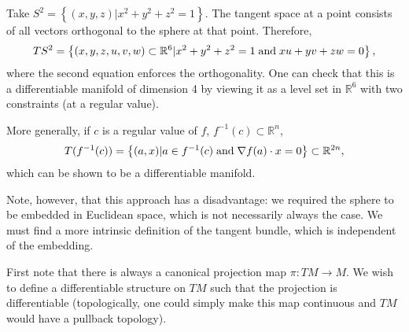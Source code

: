 \documentclass{../mathnotes}
\begin{document}
\begin{exmp}
    Take $S^2=\left\{ (x,y,z) | x^2+y^2+z^2=1 \right\}$. The tangent space at a point consists of all vectors orthogonal to the sphere at that point.
    Therefore,
    \begin{align*}
        TS^2=\left\{ (x,y,z,u,v,w)\subset \mathbb{R}^6|x^2+y^2+z^2=1 \;\textnormal{and}\; xu+yv+zw=0 \right\},
    \end{align*}
    where the second equation enforces the orthogonality. One can check that this is a differentiable manifold of dimension 4 by viewing it as a level set in
    $\mathbb{R}^6$ with two constraints (at a regular value).

    More generally, if $c$ is a regular value of $f$, $f^{-1}(c)\subset\mathbb{R}^n$,
    \begin{align*}
        T(f^{-1}(c))=\left\{ (a,x)|a\in f^{-1}(c) \;\textnormal{and}\; \nabla f(a)\cdot x=0 \right\}\subset \mathbb{R}^{2n},
    \end{align*}
    which can be shown to be a differentiable manifold.
\end{exmp}

Note, however, that this approach has a disadvantage: we required the sphere to be embedded in Euclidean space, which is not necessarily always the case.
We must find a more intrinsic definition of the tangent bundle, which is independent of the embedding.

First note that there is always a canonical projection map $\pi:TM\to M$. We wish to define a differentiable structure on $TM$ such that the projection is
differentiable (topologically, one could simply make this map continuous and $TM$ would have a pullback topology).
\end{document}
